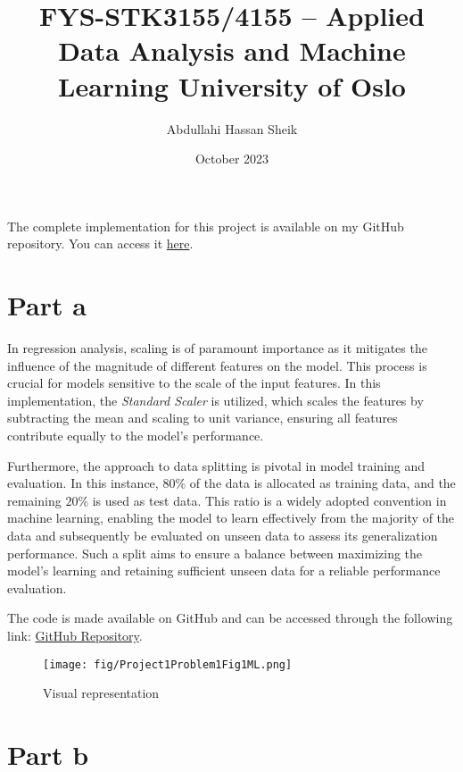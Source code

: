\documentclass{article}
\title{FYS-STK3155/4155 – Applied Data Analysis and Machine Learning 
University of Oslo}
\author{Abdullahi Hassan Sheik }
\date{October 2023}
\begin{document}
\maketitle

\paragraph{}
The complete implementation for this project is available on my GitHub repository. You can access it \href{https://github.com/SheikAbdullahi/MachineLearning/tree/main/Project1}{here}.

\section*{Part a}

In regression analysis, scaling is of paramount importance as it mitigates the influence of the magnitude of different features on the model. This process is crucial for models sensitive to the scale of the input features. In this implementation, the \textit{Standard Scaler} is utilized, which scales the features by subtracting the mean and scaling to unit variance, ensuring all features contribute equally to the model's performance.

Furthermore, the approach to data splitting is pivotal in model training and evaluation. In this instance, $80\%$ of the data is allocated as training data, and the remaining $20\%$ is used as test data. This ratio is a widely adopted convention in machine learning, enabling the model to learn effectively from the majority of the data and subsequently be evaluated on unseen data to assess its generalization performance. Such a split aims to ensure a balance between maximizing the model's learning and retaining sufficient unseen data for a reliable performance evaluation.

The code is made available on GitHub and can be accessed through the following link: \href{https://github.com/SheikAbdullahi/MachineLearning}{GitHub Repository}.

\begin{figure}[htbp]
    \centering
    \texttt{[image: fig/Project1Problem1Fig1ML.png]}
    \caption{Visual representation}
    \label{fig:python-code}
\end{figure}


\section*{Part b}
\end{document}
